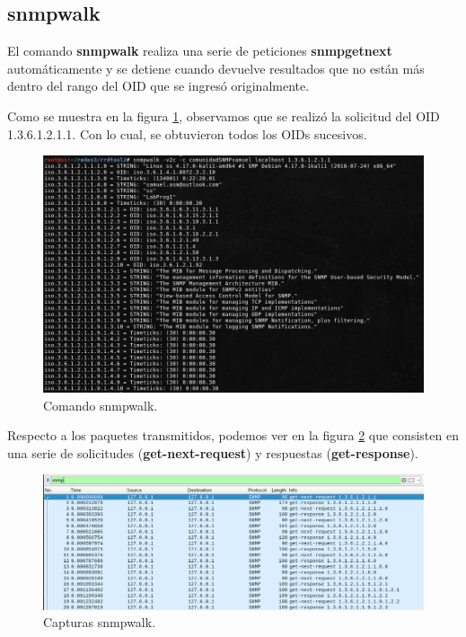\subsection{snmpwalk}

El comando \textbf{snmpwalk} realiza una serie de peticiones \textbf{snmpgetnext} automáticamente y se detiene cuando devuelve resultados que no están más dentro del rango del OID que se ingresó originalmente.

Como se muestra en la figura \ref{image:snmpwalk1}, observamos que se realizó la solicitud del OID 1.3.6.1.2.1.1. Con lo cual, se obtuvieron todos los OIDs sucesivos.

\FloatBarrier
\begin{figure}[htbp!]
		\centering
			\includegraphics[width=.9 \textwidth]{images/snmpwalk1}
		\caption{Comando snmpwalk.}
		\label{image:snmpwalk1}
\end{figure}
\FloatBarrier

Respecto a los paquetes transmitidos, podemos ver en la figura \ref{image:snmpwalk2} que consisten en una serie de solicitudes (\textbf{get-next-request}) y respuestas (\textbf{get-response}).

\FloatBarrier
\begin{figure}[htbp!]
		\centering
			\includegraphics[width=.9 \textwidth]{images/snmpwalk2}
		\caption{Capturas snmpwalk.}
		\label{image:snmpwalk2}
\end{figure}
\FloatBarrier

